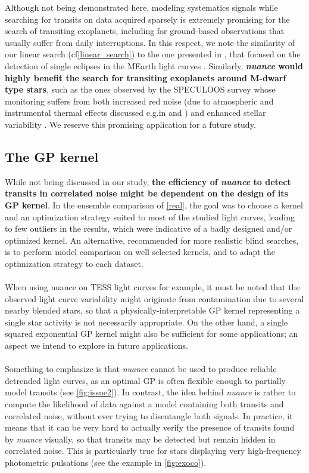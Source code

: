 \documentclass[modern,linenumbers]{aastex631}
\newcommand{\nuancemethod}{\textit{nuance}}
\newcommand{\nuancecode}{\textsf{nuance}}
\begin{document}
Although not being demonstrated here, modeling systematics signals while searching for transits on data acquired sparsely is extremely promising for the search of transiting exoplanets, including for ground-based observations that usually suffer from daily interruptions. In this respect, we note the similarity of our linear search (cf\;\autoref{linear_search}) to the one presented in \citealt{Berta2012}, that focused on the detection of single eclipses in the MEarth light curves \citep{Irwin2009}. Similarly, \textbf{\nuancemethod{} would highly benefit the search for transiting exoplanets around M-dwarf type stars}, such as the ones observed by the SPECULOOS survey \citep{speculoos} whose monitoring suffers from both increased red noise (due to atmospheric and instrumental thermal effects discussed e.g.\;in \citealt{Berta2012} and  \citealt{Pedersen2023}) and enhanced stellar variability \citep{Murray2020}. We reserve this promising application for a future study.

\subsection{The GP kernel}
While not being discussed in our study, \textbf{the efficiency of \nuancemethod{} to detect transits in correlated noise might be dependent on the design of its GP kernel}. In the ensemble comparison of \autoref{real}, the goal was to choose a kernel and an optimization strategy suited to most of the studied light curves, leading to few outliers in the results, which were indicative of a badly designed and/or optimized kernel. An alternative, recommended for more realistic blind searches, is to perform model comparison on well selected kernels, and to adapt the optimization strategy to each dataset.\\\\
When using \nuancecode{} on TESS light curves for example, it must be noted that the observed light curve variability might originate from contamination due to several nearby blended stars, so that a physically-interpretable GP kernel representing a single star activity is not necessarily appropriate. On the other hand, a single squared exponential GP kernel might also be sufficient for some applications; an aspect we intend to explore in future applications.\\\\
Something to emphasize is that \nuancemethod{} cannot be used to produce reliable detrended light curves, as an optimal GP is often flexible enough to partially model transits (see \autoref{fig:issue2}). 
In contrast, the idea behind \nuancemethod{} is rather to compute the likelihood of data against a model containing both transits and correlated noise, without ever trying to disentangle both signals. In practice, it means that it can be very hard to actually verify the presence of transits found by \nuancemethod{} visually, so that transits may be detected but remain hidden in correlated noise. This is particularly true for stars displaying very high-frequency photometric pulsations (see the example in \autoref{fig:exoco}).
\end{document}
